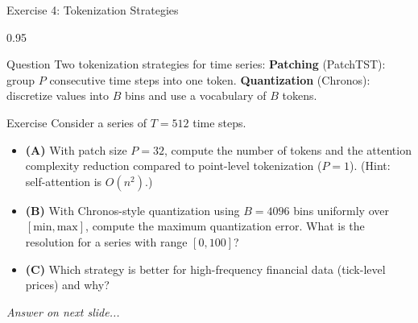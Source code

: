\documentclass[9pt, aspectratio=169, t]{beamer}
\begin{document}
\begin{frame}{Exercise 4: Tokenization Strategies}
    \begin{cminipage}{0.95\textwidth}
    {\small
    \begin{alertblock}{Question}
        Two tokenization strategies for time series:
        \textbf{Patching} (PatchTST): group $P$ consecutive time steps into one token.
        \textbf{Quantization} (Chronos): discretize values into $B$ bins and use a vocabulary of $B$ tokens.
    \end{alertblock}

    \vspace{0.1cm}

    \begin{block}{Exercise}
        Consider a series of $T = 512$ time steps.
        \begin{itemize}\setlength{\itemsep}{3pt}
            \item \textcolor{MainBlue}{\textbf{(A)}} With patch size $P = 32$, compute the number of tokens and the attention complexity reduction compared to point-level tokenization ($P=1$). (Hint: self-attention is $O(n^2)$.)
            \item \textcolor{MainBlue}{\textbf{(B)}} With Chronos-style quantization using $B = 4096$ bins uniformly over $[\text{min}, \text{max}]$, compute the maximum quantization error. What is the resolution for a series with range $[0, 100]$?
            \item \textcolor{MainBlue}{\textbf{(C)}} Which strategy is better for high-frequency financial data (tick-level prices) and why?
        \end{itemize}
    \end{block}

    \vspace{0.1cm}

    \begin{center}
        \textit{Answer on next slide...}
    \end{center}
    }
    \end{cminipage}
\end{frame}
\end{document}
